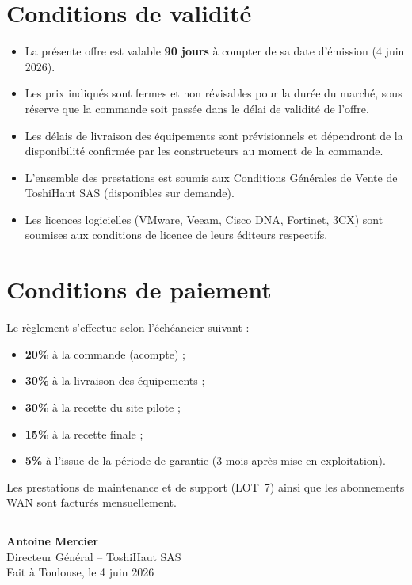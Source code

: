\documentclass[12pt,a4paper]{report}
\begin{document}
\section{Conditions de validité}

\begin{itemize}
\item La présente offre est valable \textbf{90 jours} à compter de sa date d'émission (4 juin 2026).
\item Les prix indiqués sont fermes et non révisables pour la durée du marché, sous réserve que la commande soit passée dans le délai de validité de l'offre.
\item Les délais de livraison des équipements sont prévisionnels et dépendront de la disponibilité confirmée par les constructeurs au moment de la commande.
\item L'ensemble des prestations est soumis aux Conditions Générales de Vente de ToshiHaut SAS (disponibles sur demande).
\item Les licences logicielles (VMware, Veeam, Cisco DNA, Fortinet, 3CX) sont soumises aux conditions de licence de leurs éditeurs respectifs.
\end{itemize}

\section{Conditions de paiement}

Le règlement s'effectue selon l'échéancier suivant :
\begin{itemize}
\item \textbf{20\%} à la commande (acompte) ;
\item \textbf{30\%} à la livraison des équipements ;
\item \textbf{30\%} à la recette du site pilote ;
\item \textbf{15\%} à la recette finale ;
\item \textbf{5\%} à l'issue de la période de garantie (3 mois après mise en exploitation).
\end{itemize}

Les prestations de maintenance et de support (LOT~7) ainsi que les abonnements WAN sont facturés mensuellement.

\vspace{2cm}

\begin{center}
\rule{8cm}{0.4pt}

\vspace{0.5cm}
\textbf{Antoine Mercier}\\
Directeur Général -- ToshiHaut SAS\\
Fait à Toulouse, le 4 juin 2026
\end{center}
\end{document}
